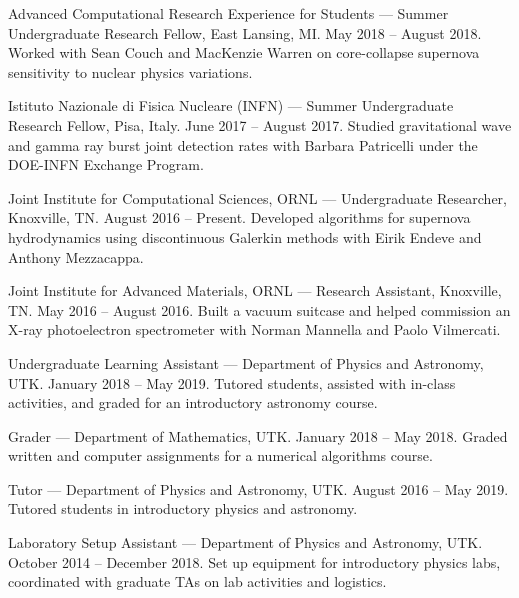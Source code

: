 \documentclass[11pt]{vitae}
\begin{document}
\begin{genericlist}
\item[] Advanced Computational Research Experience for Students — Summer Undergraduate Research Fellow, East Lansing, MI. May 2018 – August 2018. Worked with Sean Couch and MacKenzie Warren on core-collapse supernova sensitivity to nuclear physics variations.
  
\item[] Istituto Nazionale di Fisica Nucleare (INFN) — Summer Undergraduate Research Fellow, Pisa, Italy. June 2017 – August 2017. Studied gravitational wave and gamma ray burst joint detection rates with Barbara Patricelli under the DOE-INFN Exchange Program.
  
\item[] Joint Institute for Computational Sciences, ORNL — Undergraduate Researcher, Knoxville, TN. August 2016 – Present. Developed algorithms for supernova hydrodynamics using discontinuous Galerkin methods with Eirik Endeve and Anthony Mezzacappa.
  
\item[] Joint Institute for Advanced Materials, ORNL — Research Assistant, Knoxville, TN. May 2016 – August 2016. Built a vacuum suitcase and helped commission an X-ray photoelectron spectrometer with Norman Mannella and Paolo Vilmercati.
\end{genericlist}

\begin{genericlist}
  \item Undergraduate Learning Assistant — Department of Physics and Astronomy, UTK. January 2018 – May 2019. Tutored students, assisted with in-class activities, and graded for an introductory astronomy course.
  
  \item Grader — Department of Mathematics, UTK. January 2018 – May 2018. Graded written and computer assignments for a numerical algorithms course.
  
  \item Tutor — Department of Physics and Astronomy, UTK. August 2016 – May 2019. Tutored students in introductory physics and astronomy.
  
  \item Laboratory Setup Assistant — Department of Physics and Astronomy, UTK. October 2014 – December 2018. Set up equipment for introductory physics labs, coordinated with graduate TAs on lab activities and logistics.
\end{genericlist}
\end{document}
